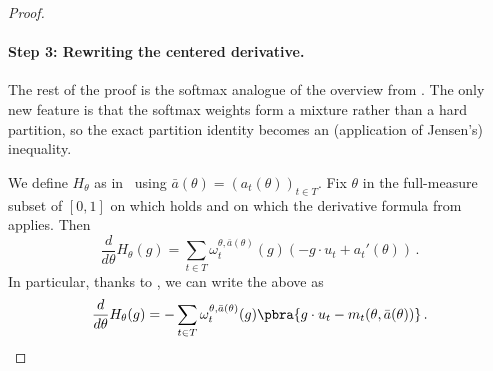 \documentclass[11pt]{article}
\begin{document}
\begin{proof}
	
	\paragraph{Step 3: Rewriting the centered derivative.} 
	
	The rest of the proof is the softmax analogue of the overview from . 
	The only new feature is that the softmax weights form a mixture rather than a hard partition, so the exact partition identity becomes an (application of Jensen's) inequality. 
	
	We define $H_\theta$ as in~ using $\bar{a}(\theta) = (a_t(\theta))_{t \in T}$.  
	Fix $\theta$ in the full-measure subset of $[0,1]$ on which  holds and on which the derivative formula from  applies.
	Then
	\begin{equation} \label{eq:H-derivative-raw}
		\frac{d}{d\theta}H_\theta(g)
		=
		\sum_{t\in T}
		\omega_t^{\theta,\bar{a}(\theta)}(g)
		\left(-g\cdot u_t+a_t'(\theta)\right)\,.
	\end{equation}
	In particular, thanks to , we can write the above as 
	\begin{equation} \label{eq:H-derivative-centered}
		\frac{d}{d\theta}H_\theta(g)
		=
		-\sum_{t \in T} \omega_t^{\theta,\bar{a}(\theta)}(g)\pbra{g\cdot u_t - m_t(\theta, \bar{a}(\theta))}\,. 
	\end{equation} 


\end{proof}
\end{document}
